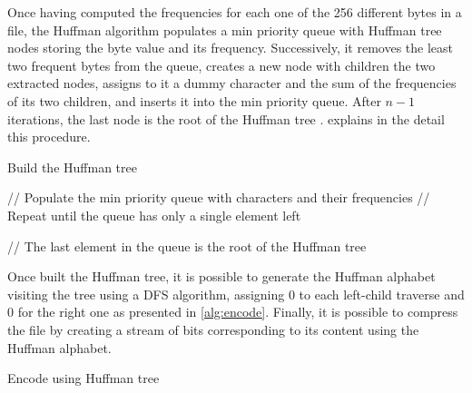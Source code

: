 Once having computed the frequencies for each one of the 256 different bytes in a file, the Huffman algorithm populates a min priority queue with Huffman tree nodes storing the byte value and its frequency. Successively, it removes the least two frequent bytes from the queue, creates a new node with children the two extracted nodes, assigns to it a dummy character and the sum of the frequencies of its two children, and inserts it into the min priority queue. After \(n-1\) iterations, the last node is the root of the Huffman tree \cite{bertossi2010algoritmi}.  explains in the detail this procedure.
\begin{algorithm}
    \caption{Build the Huffman tree}\label{alg:buildtree}

    \SetKwFor{}{}{}{}

    // Populate the min priority queue with characters and their frequencies\;
    // Repeat until the queue has only a single element left\;

    // The last element in the queue is the root of the Huffman tree\;
    \;
\end{algorithm}

Once built the Huffman tree, it is possible to generate the Huffman alphabet visiting the tree using a DFS algorithm, assigning 0 to each left-child traverse and 0 for the right one as presented in \cref{alg:encode}. Finally, it is possible to compress the file by creating a stream of bits corresponding to its content using the Huffman alphabet.

\begin{algorithm}
    \caption{Encode using Huffman tree}\label{alg:encode}
\end{algorithm}

